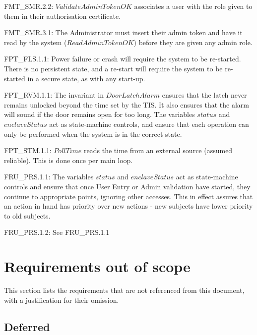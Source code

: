 {\footnotesize \sf 
FMT\_SMR.2.2:
}
\newline
	$ValidateAdminTokenOK$ associates a user with the role given to them in their authorisation certificate.

{\footnotesize \sf 
FMT\_SMR.3.1:
}
\newline
	The Administrator must insert their admin token and have it read by the system ($ReadAdminTokenOK$) before they are given any admin role.

{\footnotesize \sf 
FPT\_FLS.1.1:
}
\newline
	Power failure or crash will require the system to be re-started. There is no persistent state, and a re-start will require the system to be re-started in a secure state, as with any start-up.

{\footnotesize \sf 
FPT\_RVM.1.1:
}
\newline
	The invariant in $DoorLatchAlarm$ ensures that the latch never
	remains unlocked beyond the time set by the TIS. It also
	ensures that the alarm will sound if the door remains open for
	too long. 
	The variables $status$ and $enclaveStatus$ act as state-machine
	controls, and ensure that each operation can only be performed
	when the system is in the correct state. 

{\footnotesize \sf 
FPT\_STM.1.1:
}
\newline
	$PollTime$ reads the time from an external source (assumed
	reliable). This is done once per main loop. 

{\footnotesize \sf 
FRU\_PRS.1.1:
}
\newline
	The variables $status$ and $enclaveStatus$ act as state-machine
	controls and ensure that once User Entry or Admin validation
	have started, they continue to appropriate points, ignoring
	other accesses. This in effect assures that an action in hand
	has priority over new actions - new subjects have lower
	priority to old subjects. 

{\footnotesize \sf 
FRU\_PRS.1.2:
}
\newline
	See FRU\_PRS.1.1




\section{Requirements out of scope}
This section lists the requirements that are not referenced from this
document, with a justification for their omission.

\subsection{Deferred}

